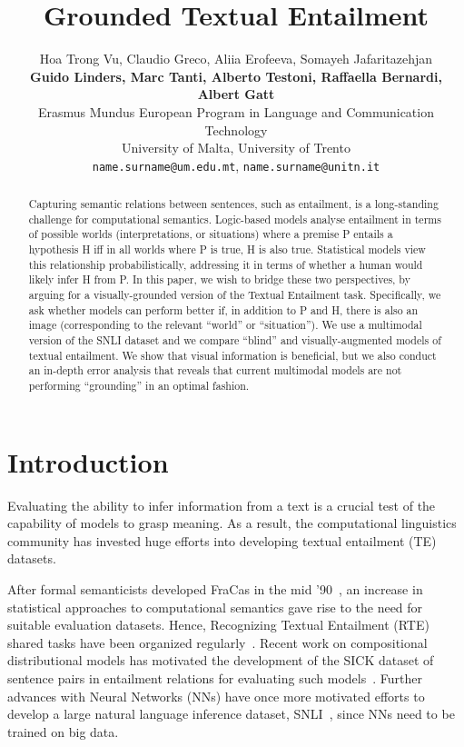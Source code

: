 \documentclass[11pt]{article}
\title{Grounded Textual Entailment}
\author{Hoa Trong Vu,  Claudio Greco, Aliia Erofeeva, Somayeh Jafaritazehjan\\
\textbf{Guido Linders, Marc Tanti,  Alberto  Testoni,
 Raffaella Bernardi, Albert Gatt}\\
 Erasmus Mundus European Program in Language and Communication
 Technology\\
University of Malta, University of Trento \\
{\tt name.surname@um.edu.mt},  {\tt name.surname@unitn.it}\\}
\date{}
\begin{document}
\maketitle

\begin{abstract}
Capturing semantic relations between sentences, such as entailment, is a long-standing challenge for computational semantics. Logic-based models analyse entailment in terms of possible worlds (interpretations, or situations) where a premise P entails a hypothesis H iff in all worlds where P is true, H is also true. Statistical models view this relationship probabilistically, addressing it in terms of whether a human would likely infer H from P. In this paper, we wish to bridge these two perspectives, by arguing for a visually-grounded version of the Textual Entailment task. Specifically, we ask whether models can perform better if, in addition to P and H, there is also an image (corresponding to the relevant ``world'' or ``situation''). We use a multimodal version of the SNLI dataset \cite{snli:emnlp2015} and we compare ``blind'' and visually-augmented models of textual entailment. We show that visual information is beneficial, but we also conduct an in-depth error analysis that reveals that current multimodal models are not performing ``grounding'' in an optimal fashion.
\end{abstract}

\section{Introduction}
\label{sec:introduction}

Evaluating the ability to infer information from a text is a crucial
 test of the capability of models to grasp meaning.  As a result,
the computational linguistics community has
invested huge efforts into developing textual entailment (TE) datasets.


After formal semanticists developed FraCas in the mid '90~\cite{coop:usin96},
an increase in statistical approaches to computational semantics 
gave rise to the need for suitable evaluation datasets.
Hence, Recognizing
Textual Entailment (RTE) shared tasks have been organized regularly~\cite{Sammons2012}.
Recent work on compositional distributional models has motivated the 
development of the SICK dataset
of sentence pairs in
entailment relations for evaluating such models~\cite{mare:sick14}.
Further advances with Neural Networks (NNs) have once more
motivated efforts to develop a large natural language inference
dataset, SNLI~\cite{snli:emnlp2015}, since NNs need to be trained on big data.  
\end{document}
